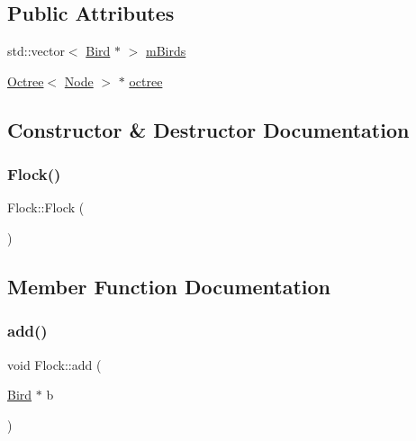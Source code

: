 \subsection*{Public Attributes}
\begin{DoxyCompactItemize}
\item 
std\+::vector$<$ \hyperlink{classBird}{Bird} $\ast$ $>$ \hyperlink{classFlock_ad742a7776e824da6281031d7d9d88d0c}{m\+Birds}
\item 
\hyperlink{classOctree}{Octree}$<$ \hyperlink{structNode}{Node} $>$ $\ast$ \hyperlink{classFlock_a1e280f2ca46cd9c68dc31c5e3d8fec2c}{octree}
\end{DoxyCompactItemize}


\subsection{Constructor \& Destructor Documentation}
\mbox{\label{classFlock_a2a0a514c368e21f718ad7358ed42f3b7}} 
\subsubsection{\texorpdfstring{Flock()}{Flock()}}
{\footnotesize\ttfamily Flock\+::\+Flock (\begin{DoxyParamCaption}{ }\end{DoxyParamCaption})}



\subsection{Member Function Documentation}
\mbox{\label{classFlock_a2bc42b2940b1ef99c120f58ee7918775}} 
\subsubsection{\texorpdfstring{add()}{add()}}
{\footnotesize\ttfamily void Flock\+::add (\begin{DoxyParamCaption}\item[{\hyperlink{classBird}{Bird} $\ast$}]{b }\end{DoxyParamCaption})}

\mbox{\label{classFlock_a8657b4c8affd9ad6a87c119f592baccb}} 
